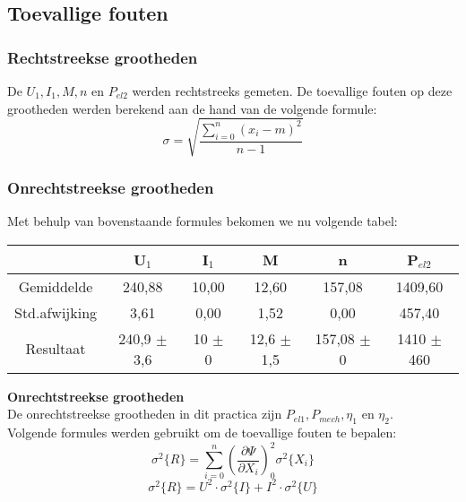\subsection{Toevallige fouten}
\subsubsection{Rechtstreekse grootheden}
De $U_1,I_1,M,n$ en $P_{el2}$ werden rechtstreeks gemeten. De toevallige fouten
op deze grootheden werden berekend aan de hand van de volgende formule: 
\begin{equation}
    \sigma=\sqrt{\frac{\sum\limits_{i=0}^n(x_i-m)^2}{n-1}}  
\end{equation}

\subsubsection{Onrechtstreekse grootheden}
Met behulp van bovenstaande formules bekomen we nu volgende tabel:

\begin{tabular}{| c | c | c | c | c | c |}
    \hline
            & U$_1$  & I$_1$ & M     & n &  P$_{el2}$ \\ \hline
    Gemiddelde & 240,88 & 10,00 & 12,60 & 157,08 & 1409,60 \\ \hline
    Std.afwijking & 3,61 & 0,00 & 1,52 & 0,00 & 457,40 \\ \hline
    Resultaat & 240,9 $\pm$ 3,6 & 10 $\pm$ 0 & 12,6 $\pm$ 1,5 & 157,08 $\pm$ 0 & 1410 $\pm$ 460 \\ \hline
\end{tabular}

\noindent \textbf{Onrechtstreekse grootheden}\\
De onrechtstreekse grootheden in dit practica zijn $P_{el1},P_{mech},\eta_{1}$ en
$\eta_2$.\\
Volgende formules werden gebruikt om de toevallige fouten te bepalen:\\
\begin{equation}
    \sigma^2\{R\}=\sum\limits_{i=0}^n\left(\frac{\partial \Psi}{\partial X_i}\right)_0^2 \sigma ^2 \{X_i\}
\end{equation}
\begin{equation*}
    \sigma^2\{R\}=U^2 \cdot \sigma ^2 \{I\} + I^2 \cdot \sigma ^2 \{U\}
\end{equation*}


